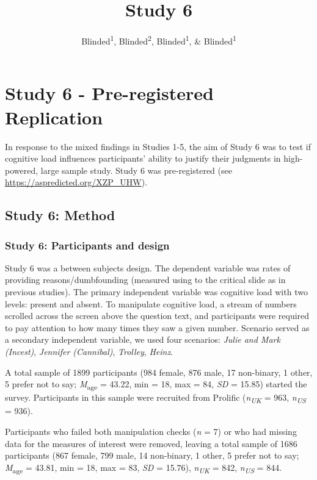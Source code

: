 \documentclass[
  american,
  man]{apa7}
\title{Study 6}
\author{Blinded\textsuperscript{1}, Blinded\textsuperscript{2}, Blinded\textsuperscript{1}, \& Blinded\textsuperscript{1}}
\date{}
\affiliation{\vspace{0.5cm}\textsuperscript{1} Blinded\\\textsuperscript{2} Blinded}
\begin{document}
\maketitle

\hypertarget{study-6---pre-registered-replication}{%
\section{Study 6 - Pre-registered Replication}\label{study-6---pre-registered-replication}}

In response to the mixed findings in Studies 1-5, the aim of Study 6 was to test if cognitive load influences participants' ability to justify their judgments in high-powered, large sample study. Study 6 was pre-registered (see \url{https://aspredicted.org/XZP_UHW}).

\hypertarget{study-6-method}{%
\subsection{Study 6: Method}\label{study-6-method}}

\hypertarget{study-6-participants-and-design}{%
\subsubsection{Study 6: Participants and design}\label{study-6-participants-and-design}}

Study 6 was a between subjects design. The dependent variable was rates of providing reasons/dumbfounding (measured using to the critical slide as in previous studies). The primary independent variable was cognitive load with two levels: present and absent. To manipulate cognitive load, a stream of numbers scrolled across the screen above the question text, and participants were required to pay attention to how many times they saw a given number. Scenario served as a secondary independent variable, we used four scenarios: \emph{Julie and Mark (Incest)}, \emph{Jennifer (Cannibal)}, \emph{Trolley}, \emph{Heinz}.

A total sample of 1899 participants (984 female, 876 male, 17 non-binary, 1 other, 5 prefer not to say; \emph{M}\textsubscript{age} = 43.22, min = 18, max = 84, \emph{SD} = 15.85) started the survey. Participants in this sample were recruited from Prolific (\emph{n\textsubscript{UK}} = 963, \emph{n\textsubscript{US}} = 936).

Participants who failed both manipulation checks (\emph{n} = 7) or who had missing data for the measures of interest were removed, leaving a total sample of 1686 participants (867 female, 799 male, 14 non-binary, 1 other, 5 prefer not to say; \emph{M}\textsubscript{age} = 43.81, min = 18, max = 83, \emph{SD} = 15.76), \emph{n\textsubscript{UK}} = 842, \emph{n\textsubscript{US}} = 844.
\end{document}
